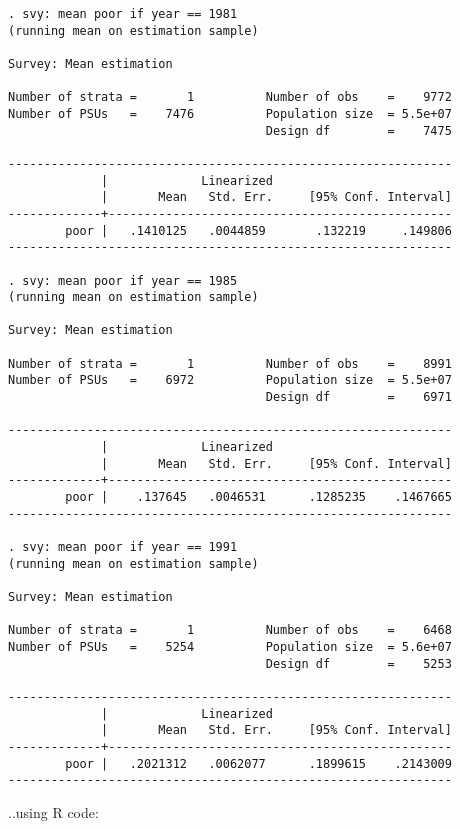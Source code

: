 \documentclass[
]{book}
\begin{document}
\begin{verbatim}
. svy: mean poor if year == 1981
(running mean on estimation sample)

Survey: Mean estimation

Number of strata =       1          Number of obs    =    9772
Number of PSUs   =    7476          Population size  = 5.5e+07
                                    Design df        =    7475

--------------------------------------------------------------
             |             Linearized
             |       Mean   Std. Err.     [95% Conf. Interval]
-------------+------------------------------------------------
        poor |   .1410125   .0044859       .132219     .149806
--------------------------------------------------------------

. svy: mean poor if year == 1985
(running mean on estimation sample)

Survey: Mean estimation

Number of strata =       1          Number of obs    =    8991
Number of PSUs   =    6972          Population size  = 5.5e+07
                                    Design df        =    6971

--------------------------------------------------------------
             |             Linearized
             |       Mean   Std. Err.     [95% Conf. Interval]
-------------+------------------------------------------------
        poor |    .137645   .0046531      .1285235    .1467665
--------------------------------------------------------------

. svy: mean poor if year == 1991
(running mean on estimation sample)

Survey: Mean estimation

Number of strata =       1          Number of obs    =    6468
Number of PSUs   =    5254          Population size  = 5.6e+07
                                    Design df        =    5253

--------------------------------------------------------------
             |             Linearized
             |       Mean   Std. Err.     [95% Conf. Interval]
-------------+------------------------------------------------
        poor |   .2021312   .0062077      .1899615    .2143009
--------------------------------------------------------------
\end{verbatim}

..using R code:
\end{document}
